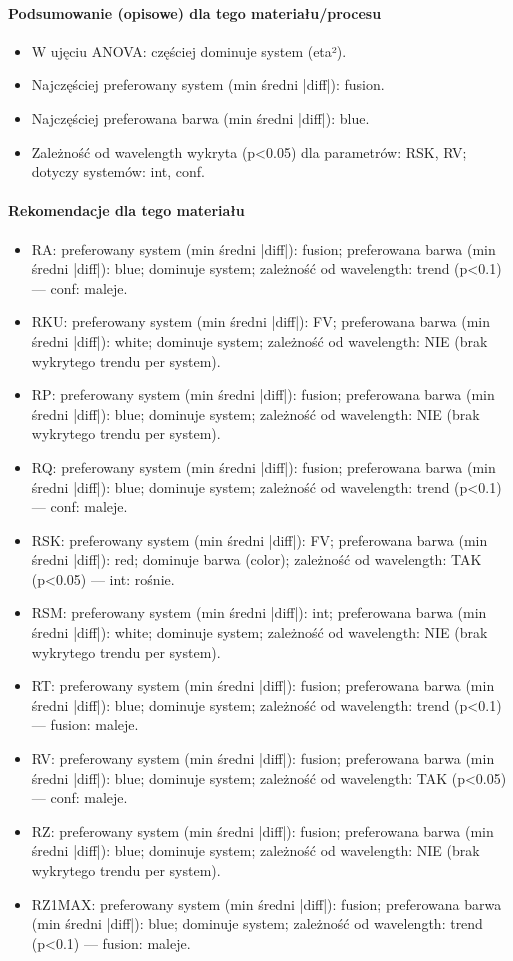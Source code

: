 \documentclass[
  10pt,
]{article}
\begin{document}
\paragraph{Podsumowanie (opisowe) dla tego materiału/procesu}
\begin{itemize}
\item W ujęciu ANOVA: częściej dominuje system (eta²).
\item Najczęściej preferowany system (min średni |diff|): fusion.
\item Najczęściej preferowana barwa (min średni |diff|): blue.
\item Zależność od wavelength wykryta (p<0.05) dla parametrów: RSK, RV; dotyczy systemów: int, conf.
\end{itemize}
\paragraph{Rekomendacje dla tego materiału}
\begin{itemize}
\item RA: preferowany system (min średni |diff|): fusion; preferowana barwa (min średni |diff|): blue; dominuje system; zależność od wavelength: trend (p<0.1) — conf: maleje.
\item RKU: preferowany system (min średni |diff|): FV; preferowana barwa (min średni |diff|): white; dominuje system; zależność od wavelength: NIE (brak wykrytego trendu per system).
\item RP: preferowany system (min średni |diff|): fusion; preferowana barwa (min średni |diff|): blue; dominuje system; zależność od wavelength: NIE (brak wykrytego trendu per system).
\item RQ: preferowany system (min średni |diff|): fusion; preferowana barwa (min średni |diff|): blue; dominuje system; zależność od wavelength: trend (p<0.1) — conf: maleje.
\item RSK: preferowany system (min średni |diff|): FV; preferowana barwa (min średni |diff|): red; dominuje barwa (color); zależność od wavelength: TAK (p<0.05) — int: rośnie.
\item RSM: preferowany system (min średni |diff|): int; preferowana barwa (min średni |diff|): white; dominuje system; zależność od wavelength: NIE (brak wykrytego trendu per system).
\item RT: preferowany system (min średni |diff|): fusion; preferowana barwa (min średni |diff|): blue; dominuje system; zależność od wavelength: trend (p<0.1) — fusion: maleje.
\item RV: preferowany system (min średni |diff|): fusion; preferowana barwa (min średni |diff|): blue; dominuje system; zależność od wavelength: TAK (p<0.05) — conf: maleje.
\item RZ: preferowany system (min średni |diff|): fusion; preferowana barwa (min średni |diff|): blue; dominuje system; zależność od wavelength: NIE (brak wykrytego trendu per system).
\item RZ1MAX: preferowany system (min średni |diff|): fusion; preferowana barwa (min średni |diff|): blue; dominuje system; zależność od wavelength: trend (p<0.1) — fusion: maleje.
\end{itemize}
\end{document}
